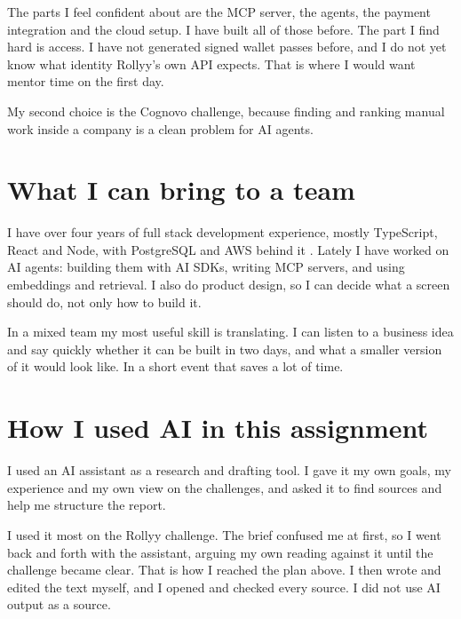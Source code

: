 \documentclass[11pt,a4paper]{article}
\begin{document}
The parts I feel confident about are the MCP server, the agents, the payment
integration and the cloud setup. I have built all of those before. The part I
find hard is access. I have not generated signed wallet passes before, and I do
not yet know what identity Rollyy's own API expects. That is where I would want
mentor time on the first day.

My second choice is the Cognovo challenge, because finding and ranking manual
work inside a company is a clean problem for AI agents.

\section*{What I can bring to a team}

I have over four years of full stack development experience, mostly TypeScript,
React and Node, with PostgreSQL and AWS behind it \cite{tauheeddev}. Lately
I have worked on AI agents: building them with AI SDKs, writing MCP servers, and
using embeddings and retrieval. I also do product design, so I can decide what a
screen should do, not only how to build it.

In a mixed team my most useful skill is translating. I can listen to a business
idea and say quickly whether it can be built in two days, and what a smaller
version of it would look like. In a short event that saves a lot of time.

\section*{How I used AI in this assignment}

I used an AI assistant as a research and drafting tool. I gave it my own goals,
my experience and my own view on the challenges, and asked it to find sources and
help me structure the report.

I used it most on the Rollyy challenge. The brief confused me at first, so I went
back and forth with the assistant, arguing my own reading against it until the
challenge became clear. That is how I reached the plan above. I then wrote and
edited the text myself, and I opened and checked every source. I did not use AI
output as a source.

\printbibliography[title={Sources}]
\end{document}
